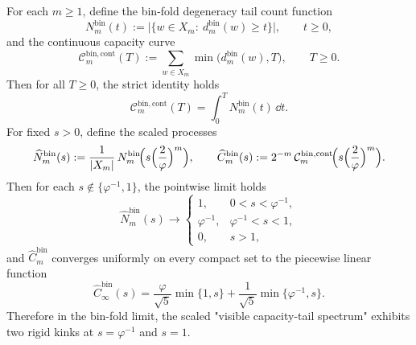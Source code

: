 \begin{proposition}\label{prop:fold-bin-degeneracy-tail-capacity-kinks}
For each \(m\ge 1\), define the bin-fold degeneracy tail count function
\[
N^{\mathrm{bin}}_m(t):=\bigl|\{w\in X_m:\ d^{\mathrm{bin}}_m(w)\ge t\}\bigr|,\qquad t\ge 0,
\]
and the continuous capacity curve
\[
\mathcal{C}^{\mathrm{bin,cont}}_m(T):=\sum_{w\in X_m}\min\bigl(d^{\mathrm{bin}}_m(w),T\bigr),\qquad T\ge 0.
\]
Then for all \(T\ge 0\), the strict identity holds
\[
\mathcal{C}^{\mathrm{bin,cont}}_m(T)=\int_{0}^{T}N^{\mathrm{bin}}_m(t)\,\dd t.
\]
For fixed \(s>0\), define the scaled processes
\[
\widehat N^{\mathrm{bin}}_m(s):=\frac{1}{|X_m|}\,N^{\mathrm{bin}}_m\!\Bigl(s\Bigl(\frac{2}{\varphi}\Bigr)^m\Bigr),
\qquad
\widehat C^{\mathrm{bin}}_m(s):=2^{-m}\,\mathcal{C}^{\mathrm{bin,cont}}_m\!\Bigl(s\Bigl(\frac{2}{\varphi}\Bigr)^m\Bigr).
\]
Then for each \(s\notin\{\varphi^{-1},1\}\), the pointwise limit holds
\[
\widehat N^{\mathrm{bin}}_m(s)\longrightarrow
\begin{cases}
1, & 0<s<\varphi^{-1},\\[2pt]
\varphi^{-1}, & \varphi^{-1}<s<1,\\[2pt]
0, & s>1,
\end{cases}
\]
and \(\widehat C^{\mathrm{bin}}_m\) converges uniformly on every compact set to the piecewise linear function
\[
\widehat C^{\mathrm{bin}}_\infty(s)
=\frac{\varphi}{\sqrt5}\min\{1,s\}+\frac{1}{\sqrt5}\min\{\varphi^{-1},s\}.
\]
Therefore in the bin-fold limit, the scaled "visible capacity-tail spectrum" exhibits two rigid kinks at \(s=\varphi^{-1}\) and \(s=1\).
\end{proposition}
